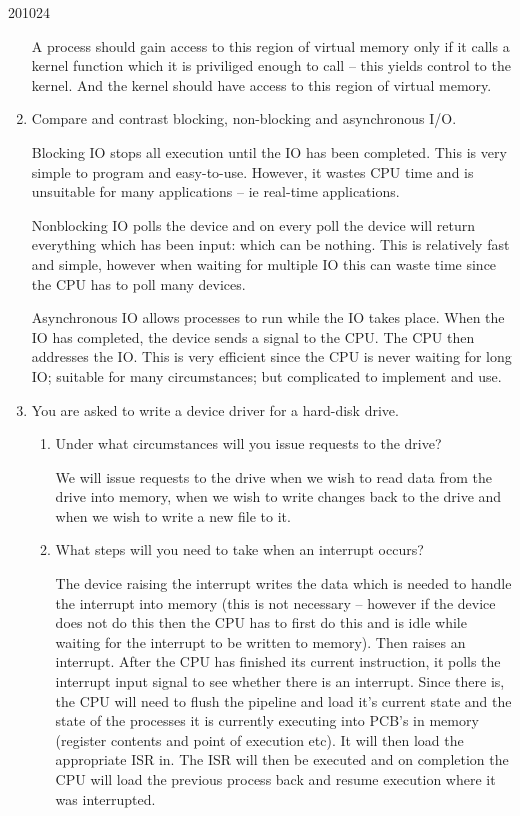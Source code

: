 \documentclass[10pt,\jkfside,a4paper]{article}
\begin{document}
\begin{examquestion}{2010}{2}{4}
\begin{enumerate}
A process should gain access to this region of virtual memory only if it calls a kernel 
function which it is priviliged enough to call -- this yields control to the kernel. 
And the kernel should have access to this region of virtual memory.

\item Compare and contrast blocking, non-blocking and asynchronous I/O.

Blocking IO stops all execution until the IO has been completed. This is 
very simple to program and easy-to-use. However, it wastes CPU time and 
is unsuitable for many applications -- ie real-time applications.

Nonblocking IO polls the device and on every poll the device will return 
everything which has been input: which can be nothing. This is relatively 
fast and simple, however when waiting for multiple IO this can waste time 
since the CPU has to poll many devices.

Asynchronous IO allows processes to run while the IO takes place. When the IO 
has completed, the device sends a signal 
to the CPU. The CPU then addresses the IO. This is very efficient since the CPU 
is never waiting for long IO; suitable for many circumstances; 
but complicated to implement and use.

\item You are asked to write a device driver for a hard-disk drive.

\begin{enumerate}

\item Under what circumstances will you issue requests to the drive?

We will issue requests to the drive when we wish to read data from the drive into 
memory, when we wish to write changes back to the drive and when we wish to write a 
new file to it.

\item What steps will you need to take when an interrupt occurs?

The device raising the interrupt writes the data which is needed to handle the 
interrupt into memory (this is not necessary -- however if the device does not 
do this then the CPU has to first do this and is idle while waiting for the 
interrupt to be written to memory). Then raises an interrupt. After the CPU has 
finished its current instruction, it polls the interrupt input signal to see 
whether there is an interrupt. Since there is, the CPU will need to flush the 
pipeline and load it's current state and the state of the processes it is 
currently executing into PCB's in memory (register contents and point of execution 
etc). It will then load the appropriate ISR in. The ISR will then be executed 
and on completion the CPU will load the previous process back and resume 
execution where it was interrupted.


\end{enumerate}
\end{enumerate}
\end{examquestion}
\end{document}
